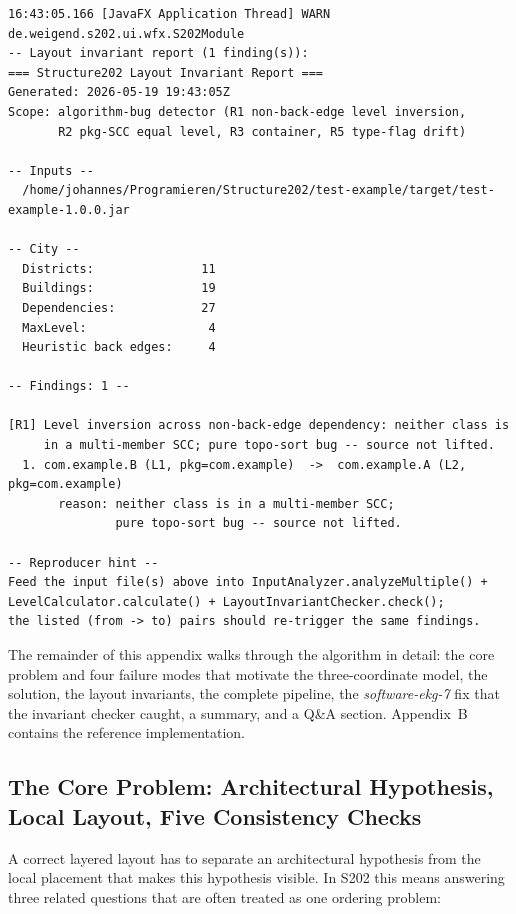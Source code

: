 \documentclass[a4paper,twoside]{article}
\begin{document}
\begin{lstlisting}[basicstyle=\scriptsize\ttfamily,frame=single,breaklines=true,columns=fullflexible,xleftmargin=0pt,xrightmargin=0pt]
16:43:05.166 [JavaFX Application Thread] WARN de.weigend.s202.ui.wfx.S202Module
-- Layout invariant report (1 finding(s)):
=== Structure202 Layout Invariant Report ===
Generated: 2026-05-19 19:43:05Z
Scope: algorithm-bug detector (R1 non-back-edge level inversion,
       R2 pkg-SCC equal level, R3 container, R5 type-flag drift)

-- Inputs --
  /home/johannes/Programieren/Structure202/test-example/target/test-example-1.0.0.jar

-- City --
  Districts:               11
  Buildings:               19
  Dependencies:            27
  MaxLevel:                 4
  Heuristic back edges:     4

-- Findings: 1 --

[R1] Level inversion across non-back-edge dependency: neither class is
     in a multi-member SCC; pure topo-sort bug -- source not lifted.
  1. com.example.B (L1, pkg=com.example)  ->  com.example.A (L2, pkg=com.example)
       reason: neither class is in a multi-member SCC;
               pure topo-sort bug -- source not lifted.

-- Reproducer hint --
Feed the input file(s) above into InputAnalyzer.analyzeMultiple() +
LevelCalculator.calculate() + LayoutInvariantChecker.check();
the listed (from -> to) pairs should re-trigger the same findings.
\end{lstlisting}

The remainder of this appendix walks through the algorithm in detail:
the core problem and four failure modes that motivate the
three-coordinate model, the solution, the layout invariants, the
complete pipeline, the \emph{software-ekg-7} fix that the invariant
checker caught, a summary, and a Q\&A section.
Appendix~B contains the reference implementation.

\subsection*{The Core Problem: Architectural Hypothesis, Local Layout, Five Consistency Checks}

A correct layered layout has to separate an architectural hypothesis from the
local placement that makes this hypothesis visible. In S202 this means answering
three related questions that are often treated as one ordering problem:
\end{document}
